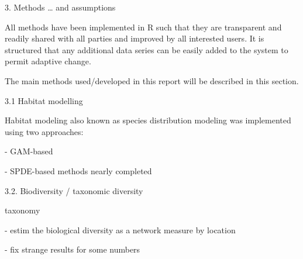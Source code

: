 \documentclass[letterpaper,portrait,12pt]{scrartcl}
\numberwithin{equation}{section}		%
\numberwithin{figure}{section}			%
\numberwithin{table}{section}				%
\begin{document}
3. Methods \ldots{} and assumptions









All methods have been implemented in R such that they are transparent and readily shared with all parties and improved by all interested users. It is structured that any additional data series can be easily added to the system to permit adaptive change.









The main methods used/developed in this report will be described in this section.









3.1 Habitat modelling 









Habitat  modeling also known as species distribution modeling was implemented using two approaches: 









- GAM-based 




- SPDE-based methods nearly completed



















3.2. Biodiversity / taxonomic diversity 




taxonomy









- estim the biological diversity as a network measure by location




- fix strange results for some numbers
\end{document}
